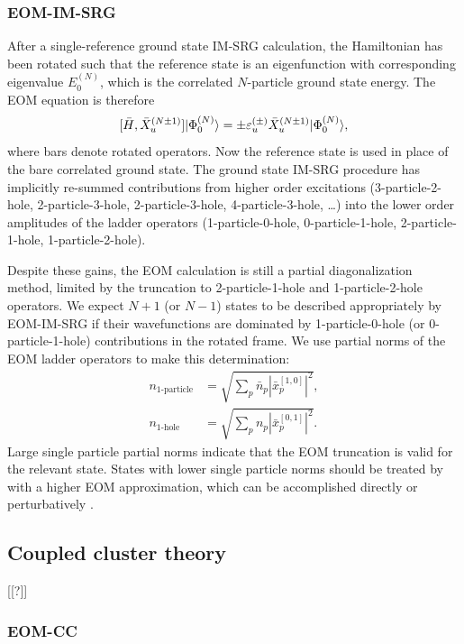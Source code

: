 \subsubsection*{EOM-IM-SRG}
After a single-reference ground state IM-SRG calculation, the Hamiltonian has been rotated such that the reference state is an eigenfunction with corresponding eigenvalue $E^{(N)}_0$, which is the correlated $N$-particle ground state energy. The EOM equation is therefore
\begin{equation}\label{eq:EOMIMSRG}
  [\bar{H},\bar{X}^{(N \pm 1)}_u] | \Phi^{(N)}_0 \rangle = \pm \varepsilon^{(\pm)}_u \bar{X}^{(N \pm 1)}_u | \Phi^{(N)}_0 \rangle,
\end{equation}
where bars denote rotated operators. Now the reference state is used in place of the bare correlated ground state. The ground state IM-SRG procedure has implicitly re-summed contributions from higher order excitations (3-particle-2-hole, 2-particle-3-hole, 2-particle-3-hole, 4-particle-3-hole, \ldots) into the lower order amplitudes of the ladder operators (1-particle-0-hole, 0-particle-1-hole, 2-particle-1-hole, 1-particle-2-hole).

Despite these gains, the EOM calculation is still a partial diagonalization method, limited by the truncation to 2-particle-1-hole and 1-particle-2-hole operators. We expect $N + 1$ (or $N - 1$) states to be described appropriately by EOM-IM-SRG if their wavefunctions are dominated by 1-particle-0-hole (or 0-particle-1-hole) contributions in the rotated frame. We use partial norms of the EOM ladder operators to make this determination:
\begin{align}\label{eq:partial_norms}
  n_{\text{1-particle}} &= \sqrt{\sum_p \bar{n}_p | \bar{x}^{[1,0]}_p |^2},\\
  n_{\text{1-hole}} &= \sqrt{\sum_p n_p | \bar{x}^{[0,1]}_p |^2}.
\end{align}
Large single particle partial norms indicate that the EOM truncation is valid for the relevant state. States with lower single particle norms should be treated by with a higher EOM approximation, which can be accomplished directly or perturbatively \cite{PhysRevC.95.044304}.

\subsection{Coupled cluster theory}

[[?]]

\subsubsection{EOM-CC}

